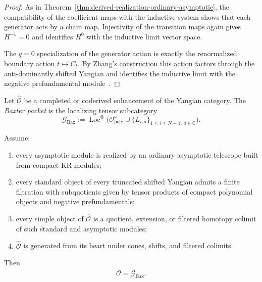 \begin{proof}
As in Theorem~\ref{thm:derived-realization-ordinary-asymptotic}, the
compatibility of the coefficient maps with the inductive system shows that
each generator acts by a chain map. Injectivity of the transition maps
again gives $H^{-1}=0$ and identifies $H^0$ with the inductive limit
vector space.

The $q=0$ specialization of the generator action is exactly the renormalized
boundary action $t\mapsto C_t$. By Zhang's construction this action
factors through the anti-dominantly shifted Yangian and identifies the
inductive limit with the negative prefundamental module~\cite{Zhang24}.
\end{proof}

\begin{definition}
\label{def:baxter-packet}
Let $\widehat{\mathcal O}$ be a completed or coderived enhancement of the
Yangian category. The \emph{Baxter packet} is the localizing tensor
subcategory
\begin{equation}
\mathcal G_{\mathrm{Bax}}
:=
\operatorname{Loc}^{\otimes}
\Big(
\mathcal O^{\omega}_{\mathrm{poly}}
\cup
\{L^-_{i,a}\}_{1\le i\le N-1,\,a\in\mathbb C}
\Big).
\end{equation}
\end{definition}

\begin{theorem}
\ClaimStatusProvedHere
\label{thm:baxter-envelope-criterion}
Assume:
\begin{enumerate}
 \item every asymptotic module is realized by an ordinary asymptotic
 telescope built from compact KR modules;
 \item every standard object of every truncated shifted Yangian admits
 a finite filtration with subquotients given by tensor products of
 compact polynomial objects and negative prefundamentals;
 \item every simple object of $\widehat{\mathcal O}$ is a quotient,
 extension, or filtered homotopy colimit of such standard and
 asymptotic modules;
 \item $\widehat{\mathcal O}$ is generated from its heart under cones,
 shifts, and filtered colimits.
\end{enumerate}
Then
\begin{equation}
\widehat{\mathcal O}=\mathcal G_{\mathrm{Bax}}.
\end{equation}
\end{theorem}

